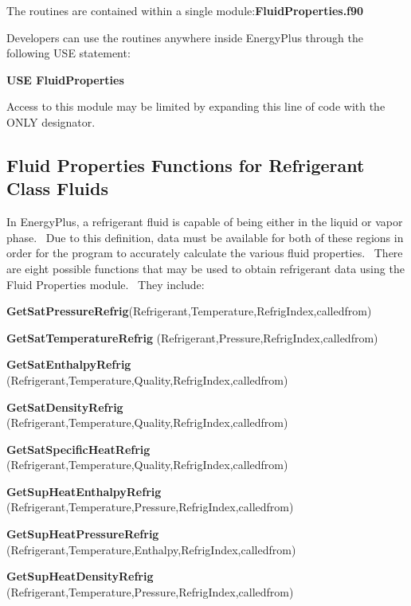 The routines are contained within a single module:\textbf{FluidProperties.f90}

Developers can use the routines anywhere inside EnergyPlus through the following USE statement:

\textbf{USE FluidProperties}

Access to this module may be limited by expanding this line of code with the ONLY designator.

\subsection{Fluid Properties Functions for Refrigerant Class Fluids}\label{fluid-properties-functions-for-refrigerant-class-fluids}

In EnergyPlus, a refrigerant fluid is capable of being either in the liquid or vapor phase.~ Due to this definition, data must be available for both of these regions in order for the program to accurately calculate the various fluid properties.~ There are eight possible functions that may be used to obtain refrigerant data using the Fluid Properties module.~ They include:

\textbf{GetSatPressureRefrig}(Refrigerant,Temperature,RefrigIndex,calledfrom)

\textbf{GetSatTemperatureRefrig} (Refrigerant,Pressure,RefrigIndex,calledfrom)

\textbf{GetSatEnthalpyRefrig} (Refrigerant,Temperature,Quality,RefrigIndex,calledfrom)

\textbf{GetSatDensityRefrig} (Refrigerant,Temperature,Quality,RefrigIndex,calledfrom)

\textbf{GetSatSpecificHeatRefrig} (Refrigerant,Temperature,Quality,RefrigIndex,calledfrom)

\textbf{GetSupHeatEnthalpyRefrig} (Refrigerant,Temperature,Pressure,RefrigIndex,calledfrom)

\textbf{GetSupHeatPressureRefrig} (Refrigerant,Temperature,Enthalpy,RefrigIndex,calledfrom)

\textbf{GetSupHeatDensityRefrig} (Refrigerant,Temperature,Pressure,RefrigIndex,calledfrom)

